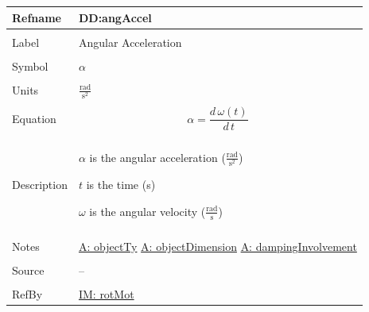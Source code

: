 \documentclass[12pt]{article}
\begin{document}
\noindent \begin{minipage}{\textwidth}
\begin{tabular}{p{} p{}}
\toprule \textbf{Refname} & \textbf{DD:angAccel}
\label{DD:angAccel}
\\ \midrule \\
Label & Angular Acceleration
\\ \midrule \\
Symbol & $α$
\\ \midrule \\
Units & $\frac{\text{rad}}{\text{s}^{2}}$
\\ \midrule \\
Equation & \begin{displaymath}
           α=\frac{d\,ω\left(t\right)}{d\,t}
           \end{displaymath}
\\ \midrule \\
Description & \begin{symbDescription}
              \item{$α$ is the angular acceleration ($\frac{\text{rad}}{\text{s}^{2}}$)}
              \item{$t$ is the time (s)}
              \item{$ω$ is the angular velocity ($\frac{\text{rad}}{\text{s}}$)}
              \end{symbDescription}
\\ \midrule \\
Notes & \hyperref[assumpOT]{A: objectTy}
        \hyperref[assumpOD]{A: objectDimension}
        \hyperref[assumpDI]{A: dampingInvolvement}
\\ \midrule \\
Source & --
\\ \midrule \\
RefBy & \hyperref[IM:rotMot]{IM: rotMot}
\\ \bottomrule \end{tabular}
\end{minipage}
\par~
\end{document}
